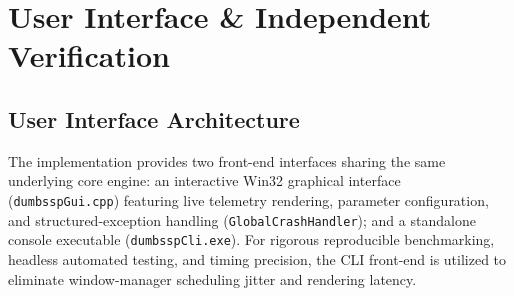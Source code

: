 \documentclass[journal,onecolumn,11pt]{IEEEtran}
\begin{document}
\begin{table}[t]
\centering
\caption{Qualitative Paradigm Comparison}
\label{tab:comparison}
\renewcommand{\arraystretch}{1.3}
\footnotesize
{}
\end{table}

\section{User Interface \& Independent Verification}
\label{sec:ui_verification}

\subsection{User Interface Architecture}
The implementation provides two front-end interfaces sharing the same underlying core engine: an interactive Win32 graphical interface (\texttt{dumbsspGui.cpp}) featuring live telemetry rendering, parameter configuration, and structured-exception handling (\texttt{GlobalCrashHandler}); and a standalone console executable (\texttt{dumbsspCli.exe}). For rigorous reproducible benchmarking, headless automated testing, and timing precision, the CLI front-end is utilized to eliminate window-manager scheduling jitter and rendering latency.
\end{document}
